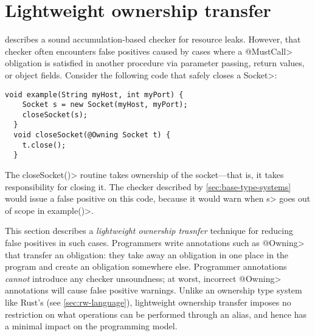\section{Lightweight ownership transfer}
\label{sec:lightweight-ownership}



 describes a sound accumulation-based
checker for resource leaks. However, that checker often encounters false
positives caused by cases where a \<@MustCall> obligation is satisfied
in another procedure via parameter passing, return values, or object fields.
Consider the following code that safely closes a \<Socket>:


\begin{lstlisting}[frame=tb,belowskip=3mm]
  void example(String myHost, int myPort) {
    Socket s = new Socket(myHost, myPort);
    closeSocket(s);
  }
  void closeSocket(@Owning Socket t) {
    t.close();
  }  
\end{lstlisting}

The \<closeSocket()> routine takes ownership of the socket---that is,
it takes responsibility for closing it. The checker described by
\cref{sec:base-type-systems} would issue a false positive on this
code, because it would warn when \<s>
goes out of scope in \<example()>.

This section describes a \emph{lightweight ownership trasnfer} technique for reducing
false positives in such cases.
Programmers write annotations such as \<@Owning> that transfer an
obligation:  they take away an obligation
in one place in the program and create an obligation somewhere else.
Programmer
annotations \emph{cannot} introduce any checker unsoundness; at worst,
incorrect \<@Owning> annotations will cause false positive warnings.
Unlike an ownership type system like Rust's (see \cref{sec:rw-language}),
lightweight ownership transfer imposes no restriction on what operations can be performed
through an alias, and hence has a minimal impact on the programming model.

